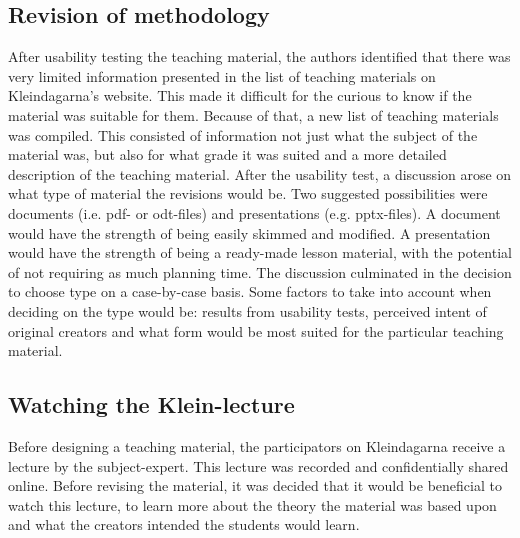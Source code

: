 \subsection{Revision of methodology}
After usability testing the teaching material, the authors identified that there was very limited information presented in the list of teaching materials on Kleindagarna's website. This made it difficult for the curious to know if the material was suitable for them. Because of that, a new list of teaching materials was compiled. This consisted of information not just what the subject of the material was, but also for what grade it was suited and a more detailed description of the teaching material.
After the usability test, a discussion arose on what type of material the revisions would be. Two suggested possibilities were documents (i.e. pdf- or odt-files) and presentations (e.g. pptx-files). A document would have the strength of being easily skimmed and modified. A presentation would have the strength of being a ready-made lesson material, with the potential of not requiring as much planning time. The discussion culminated in the decision to choose type on a case-by-case basis. Some factors to take into account when deciding on the type would be: results from usability tests, perceived intent of original creators and what form would be most suited for the particular teaching material.
\vspace{1.6cm}
\subsection{Watching the Klein-lecture}
Before designing a teaching material, the participators on Kleindagarna receive a lecture by the subject-expert. This lecture was recorded and confidentially shared online. Before revising the material, it was decided that it would be beneficial to watch this lecture, to learn more about the theory the material was based upon and what the creators intended the students would learn.
\vspace{1.6cm}

